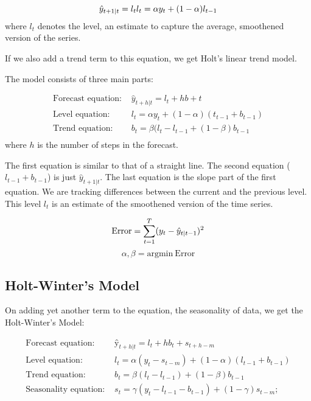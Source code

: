 \begin{equation}
  \hat y_{t+1|t} = l_t \\
  l_t = \alpha y_t + (1 - \alpha) l_{t-1}
\end{equation}
where $l_t$ denotes the level, an estimate to capture the average, smoothened version of the series.

If we also add a trend term to this equation, we get Holt's linear trend model.

The model consists of three main parts:

\begin{align*}
  \textrm{Forecast equation: } & \hat y_{t+h|t} = l_t + h b+t \\
  \textrm{Level equation: } & l_t = \alpha y_t + (1 - \alpha)(t_{t-1} + b_{t-1}) \\
  \textrm{Trend equation: } & b_t = \beta (l_t - l_{t-1} + (1 - \beta) b_{t-1} \\
\end{align*}
where $h$ is the number of steps in the forecast.

The first equation is similar to that of a straight line. The second equation ($l_{t-1} + b_{t-1}$) is just $\hat y_{t+1|t}$. The last equation is the slope part of the first equation. We are tracking differences between the current and the previous level. This level $l_t$ is an estimate of the smoothened version of the time series.

\[
  \textrm{Error} = \sum_{t=1}^T (y_t - \hat y_{t|t-1})^2 \\
\]
\[
  \alpha, \beta = \textrm{argmin} \ \textrm{Error}
\]

\subsection{Holt-Winter's Model}

On adding yet another term to the equation, the seasonality of data, we get the Holt-Winter’s Model:

\begin{align*}
  \textrm{Forecast equation: } & ŷ_{t+h|t} = l_t + hb_t + s_{t+h-m} \\
  \textrm{Level equation: } & l_t = \alpha (y_t - s_{t-m}) + (1-\alpha)(l_{t-1} + b_{t-1}) \\
  \textrm{Trend equation: } & b_t = \beta(l_t -  l_{t-1}) + (1 - \beta)b_{t-1} \\
  \textrm{Seasonality equation: } & s_t = \gamma(y_t - l_{t-1} - b_{t-1}) + (1 - \gamma)s_{t-m};
\end{align*}

